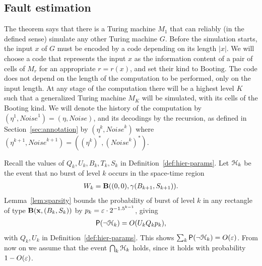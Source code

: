 \documentclass[11pt]{memoir}
\theoremstyle{definition} %
\renewcommand{\vek}[1]{\mathbf{#1}}
\def\B{B}
\def\U{U}
\def\G{G} %
\newcommand{\Noise}{\mathit{Noise}}
\newcommand{\Q}{Q} %
\renewcommand{\S}{S} %
\newcommand{\Tu}{T}
\newcommand{\x}{\vek{x}} %
\newcommand{\Booting}{\mathrm{Booting}}
\begin{document}
\subsection{Fault estimation}\label{sec:fault-estimation}

The theorem says that there is a Turing machine \( M_{1} \) that can reliably (in the defined sense)
simulate any other Turing machine \( \G \).
Before the simulation starts, the input \( x \) of \( \G \) must be encoded by a code depending on
its length \( |x| \).
We will choose a code that represents the input \( x \) as the information content of a
pair of cells of \( M_{r} \) for an appropriate \( r=r(x) \), and set their kind to \( \Booting \).
The code does not depend on the length of the computation to be performed, only on the input length.
At any stage of the computation there will be a highest level \( K \) such that a generalized Turing
machine \( M_{K} \) will be simulated, with its cells of the Booting kind.
We will denote the history of the computation by \( (\eta^{1},\Noise^{1})=(\eta,\Noise) \),
and its decodings by the recursion, as defined in Section~\ref{sec:annotation} by
\( (\eta^{k},\Noise^{k}) \) where
\( (\eta^{k+1},\Noise^{k+1})=((\eta^{k})^{*},(\Noise^{k})^{*}) \).

Recall the values of \( \Q_{k},\U_{k},\B_{k},\Tu_{k},\S_{k}\) in
Definition~\ref{def:hier-params}.
Let \(  \mathcal{H}_{k}  \) be the event that no burst of level \( k \) occurs in the space-time region
\begin{align*}
 W_{k} = \bB(\pair{0}{0},\gamma\pair{\B_{k+1}}{\S_{k+1}}) .
\end{align*}
Lemma~\ref{lem:sparsity} bounds the probability of burst of level \( k \)
in any rectangle of type \( \bB(\x,\pair{\B_{k}}{\S_{k}}) \) by
\( p_{k} =\varepsilon \cdot 2^{-1.5^{k-1}} \), giving
\begin{align*}
   \Prob(\neg\cH_{k}) = O(\U_{k}\Q_{k}p_{k}),
\end{align*}
with \( \Q_{k},\U_{k} \) in Definition~\ref{def:hier-params}.
This shows \( \sum_{k}\operatorname{\mathsf P}(\neg\mathcal{H}_{k}) = O(\varepsilon) \).
From now on we assume that the event \( \bigcap_{k}\mathcal{H}_{k} \) holds, since it holds
with probability \( 1-O(\varepsilon) \).
\end{document}
